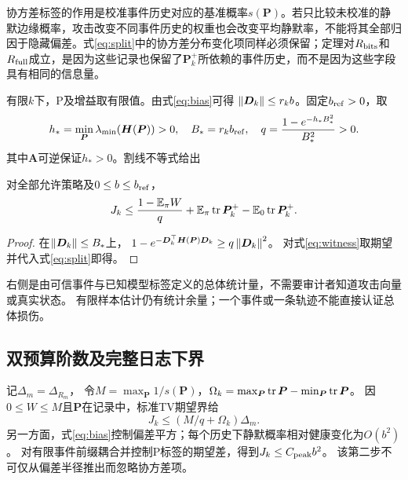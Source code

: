 协方差标签的作用是校准事件历史对应的基准概率$s({\bm{P}})$。若只比较未校准的静默边缘概率，攻击改变不同事件历史的权重也会改变平均静默率，不能将其全部归因于隐藏偏差。式\eqref{eq:split}中的协方差分布变化项同样必须保留；定理对$R_{\rm bits}$和$R_{\rm full}$成立，是因为这些记录也保留了${\bm{P}}_k^+$所依赖的事件历史，而不是因为这些字段具有相同的信息量。

有限$k$下，P及增益取有限值。由式\eqref{eq:bias}可得
$\left\|{\bm{D}}_k\right\|\le r_kb$。固定$b_{\rm ref}>0$，取
\[
h_*=\min_{\bm{P}}\lambda_{\min}({\bm{H}}({\bm{P}}))>0,\quad
B_*=r_kb_{\rm ref},\quad q=\frac{1-e^{-h_*B_*^2}}{B_*^2}>0.
\]
其中${\bm{A}}$可逆保证$h_*>0$。割线不等式给出
\begin{proposition}[可信下一事件给出的总体损伤上界]
对全部允许策略及$0\le b\le b_{\rm ref}$，
\begin{equation}
J_k\le \frac{1-\mathbb E_\pi W}{q}
+\mathbb E_\pi\operatorname{tr} {\bm{P}}_k^+-\mathbb E_0\operatorname{tr} {\bm{P}}_k^+.
\label{eq:certificate}
\end{equation}
\end{proposition}
\begin{proof}
在$\left\|{\bm{D}}_k\right\|\le B_*$上，
$1-e^{-{\bm{D}}_k^\top {\bm{H}}({\bm{P}}){\bm{D}}_k}\ge q\left\|{\bm{D}}_k\right\|^2$。
对式\eqref{eq:witness}取期望并代入式\eqref{eq:split}即得。
\end{proof}
右侧是由可信事件与已知模型标签定义的总体统计量，不需要审计者知道攻击向量或真实状态。
有限样本估计仍有统计余量；一个事件或一条轨迹不能直接认证总体损伤。

\subsection{双预算阶数及完整日志下界}
记$\Delta_m=\Delta_{R_m}$，
令$M=\max_{\bm{P}}1/s({\bm{P}})$，$\Omega_k=\max_{\bm{P}}\operatorname{tr} {\bm{P}}-\min_{\bm{P}}\operatorname{tr} {\bm{P}}$。
因$0\le W\le M$且${\bm{P}}$在记录中，标准TV期望界给
\[
J_k\le(M/q+\Omega_k)\Delta_m.
\]
另一方面，式\eqref{eq:bias}控制偏差平方；每个历史下静默概率相对健康变化为$O(b^2)$。
对有限事件前缀耦合并控制P标签的期望差，得到$J_k\le C_{\rm peak}b^2$。
该第二步不可仅从偏差半径推出而忽略协方差项。

